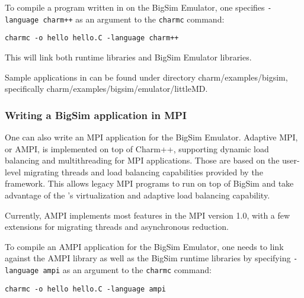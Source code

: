                  To compile a program written in \charmpp{} on the BigSim Emulator, one
specifies \texttt{-language charm++} as an argument to the {\tt charmc} command:
\begin{verbatim}
charmc -o hello hello.C -language charm++
\end{verbatim}
        This will link both \charmpp{} runtime libraries and BigSim Emulator
libraries.

Sample applications in \charmpp{} can be found under directory
        charm/examples/bigsim, specifically charm/examples/bigsim/emulator/littleMD.

        \subsubsection{Writing a BigSim application in MPI}

        One can also write an MPI application for the BigSim Emulator.
            Adaptive MPI, or AMPI, is implemented on top of Charm++, supporting
        dynamic load balancing and multithreading for MPI applications. Those are based
on the user-level migrating threads and load balancing capabilities provided
by the \charmpp{} framework. This allows legacy MPI programs to run 
        on top of BigSim \charmpp{} and take advantage of the \charmpp{}'s
virtualization and adaptive load balancing capability.

        Currently, AMPI implements most features in the MPI version 1.0, with a few
extensions for migrating threads and asynchronous reduction.

                 To compile an AMPI application for the BigSim Emulator, one needs
        to link against the AMPI library as well as the BigSim \charmpp{} runtime
libraries by specifying \texttt{-language ampi} as an argument to 
        the {\tt charmc} command:
\begin{verbatim}
charmc -o hello hello.C -language ampi
\end{verbatim}


